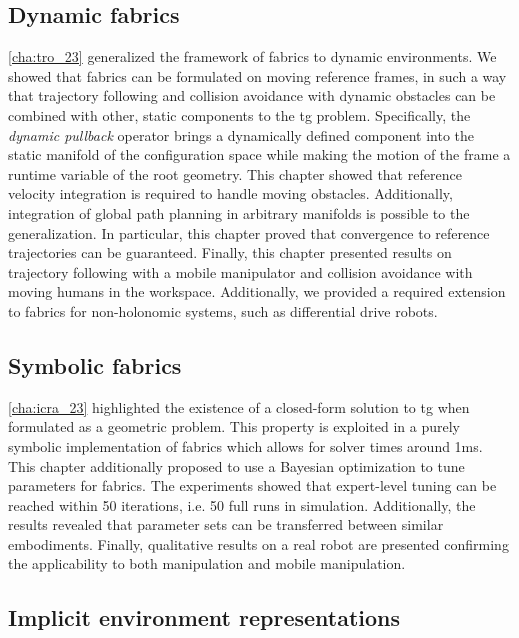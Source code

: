 \subsection{Dynamic fabrics}
\label{sec:conclusion_dynamic_fabrics}

\cref{cha:tro_23} generalized the framework of \ac{fabrics} to dynamic
environments. We showed that \ac{fabrics} can be formulated on moving reference
frames, in such a way that trajectory following and collision avoidance with
dynamic obstacles can be combined with other, static components to the \ac{tg}
problem. Specifically, the \textit{dynamic pullback}
operator brings a dynamically defined component into the static manifold of the
configuration space while making the motion of the frame a runtime variable of
the root geometry. This chapter showed that reference velocity integration is
required to handle moving obstacles. Additionally, integration of global path
planning in arbitrary manifolds is possible to the generalization. In
particular, this chapter proved that convergence to reference trajectories can be 
guaranteed. Finally, this chapter presented results on trajectory following with a
mobile manipulator and collision avoidance with moving humans in the workspace.
Additionally, we provided a required extension to
\ac{fabrics} for non\hyp{}holonomic systems, such as differential
drive robots.

\subsection{Symbolic fabrics}
\label{sec:conclusion_symbolic_fabrics}

\cref{cha:icra_23} highlighted the existence of a
closed-form solution to \ac{tg} when formulated as a geometric problem.
This property is exploited in a purely symbolic implementation of \ac{fabrics}
which allows for solver times around 1ms. This chapter additionally
proposed to use a Bayesian optimization to tune parameters
for \ac{fabrics}.
The experiments showed that expert-level tuning can be reached within 50 iterations, 
i.e. 50 full runs in simulation.
Additionally, the results revealed that parameter sets can be transferred between
similar embodiments. Finally, qualitative results on a real robot are presented
confirming the applicability to both manipulation and mobile
manipulation.

\subsection{Implicit environment representations}
\label{sec:conclusion_implicit}

